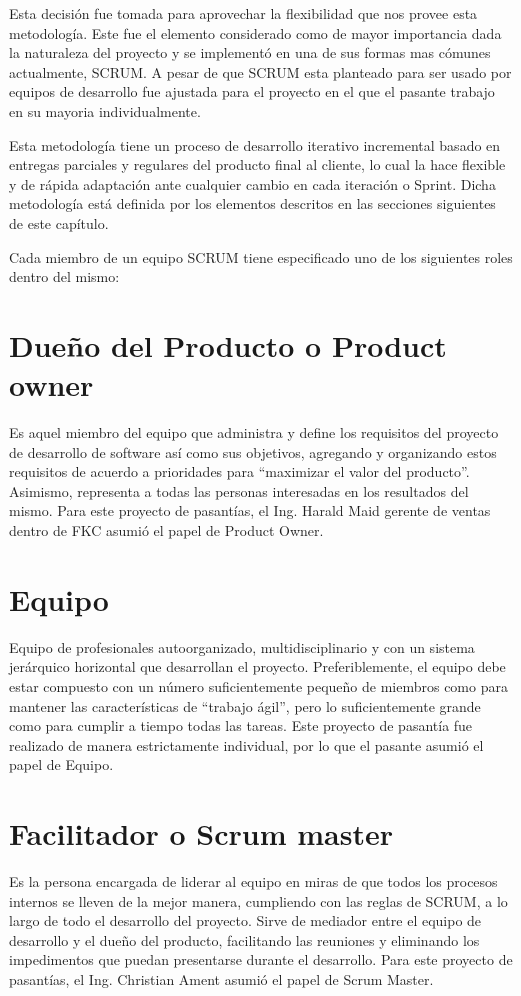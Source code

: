 Esta decisión fue tomada para aprovechar la flexibilidad que nos provee esta metodología. Este fue el elemento considerado como de mayor importancia dada la naturaleza del proyecto y se implementó en una de sus formas mas cómunes actualmente, SCRUM. A pesar de que SCRUM esta planteado para ser usado por equipos de desarrollo fue ajustada para el proyecto en el que el pasante trabajo en su mayoria individualmente.

Esta metodología tiene un proceso de desarrollo iterativo incremental basado en entregas parciales y regulares del producto final al cliente, lo cual la hace flexible y de rápida adaptación ante cualquier cambio en cada iteración o Sprint. Dicha metodología está definida por los elementos descritos en las secciones siguientes de este capítulo.

Cada miembro de un equipo SCRUM tiene especificado uno de los siguientes roles dentro del mismo:

\section{Dueño del Producto o Product owner}
Es aquel miembro del equipo que administra y define los requisitos del proyecto de desarrollo de software así como sus objetivos, agregando y organizando estos requisitos de acuerdo a prioridades para “maximizar el valor del producto”. Asimismo, representa a todas las personas interesadas en los resultados del mismo.
Para este proyecto de pasantías, el Ing. Harald Maid gerente de ventas dentro de FKC asumió el papel de Product Owner.

\section{Equipo}
Equipo de profesionales autoorganizado, multidisciplinario y con un sistema jerárquico horizontal que desarrollan el proyecto. Preferiblemente, el equipo debe estar compuesto con un número suficientemente pequeño de miembros como para mantener las características de “trabajo ágil”, pero lo suficientemente grande como para cumplir a tiempo todas las tareas.
Este proyecto de pasantía fue realizado de manera estrictamente individual, por lo que el pasante asumió el papel de Equipo.

\section{Facilitador o Scrum master}
Es la persona encargada de liderar al equipo en miras de que todos los procesos internos se lleven de la mejor manera, cumpliendo con las reglas de SCRUM, a lo largo de todo el desarrollo del proyecto. Sirve de mediador entre el equipo de desarrollo y el dueño del producto, facilitando las reuniones y eliminando los impedimentos que puedan presentarse durante el desarrollo.
Para este proyecto de pasantías, el Ing. Christian Ament asumió el papel de Scrum Master.

